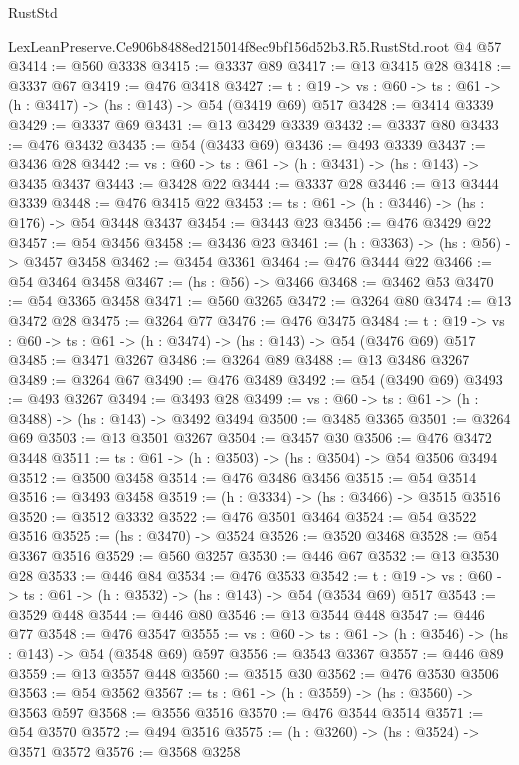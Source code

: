 \begin{lexlean}{RustStd}
\begin{coremodule}
  LexLeanPreserve.Ce906b8488ed215014f8ec9bf156d52b3.R5.RustStd.root @4 @57
@3414 := @560 @3338
@3415 := @3337 @89
@3417 := @13 @3415 @28
@3418 := @3337 @67
@3419 := @476 @3418
@3427 := {t : @19} -> {vs : @60} -> {ts : @61} -> (h : @3417) -> (hs : @143) -> @54 (@3419 @69) @517
@3428 := @3414 @3339
@3429 := @3337 @69
@3431 := @13 @3429 @3339
@3432 := @3337 @80
@3433 := @476 @3432
@3435 := @54 (@3433 @69)
@3436 := @493 @3339
@3437 := @3436 @28
@3442 := {vs : @60} -> {ts : @61} -> (h : @3431) -> (hs : @143) -> @3435 @3437
@3443 := @3428 @22
@3444 := @3337 @28
@3446 := @13 @3444 @3339
@3448 := @476 @3415 @22
@3453 := {ts : @61} -> (h : @3446) -> (hs : @176) -> @54 @3448 @3437
@3454 := @3443 @23
@3456 := @476 @3429 @22
@3457 := @54 @3456
@3458 := @3436 @23
@3461 := (h : @3363) -> (hs : @56) -> @3457 @3458
@3462 := @3454 @3361
@3464 := @476 @3444 @22
@3466 := @54 @3464 @3458
@3467 := (hs : @56) -> @3466
@3468 := @3462 @53
@3470 := @54 @3365 @3458
@3471 := @560 @3265
@3472 := @3264 @80
@3474 := @13 @3472 @28
@3475 := @3264 @77
@3476 := @476 @3475
@3484 := {t : @19} -> {vs : @60} -> {ts : @61} -> (h : @3474) -> (hs : @143) -> @54 (@3476 @69) @517
@3485 := @3471 @3267
@3486 := @3264 @89
@3488 := @13 @3486 @3267
@3489 := @3264 @67
@3490 := @476 @3489
@3492 := @54 (@3490 @69)
@3493 := @493 @3267
@3494 := @3493 @28
@3499 := {vs : @60} -> {ts : @61} -> (h : @3488) -> (hs : @143) -> @3492 @3494
@3500 := @3485 @3365
@3501 := @3264 @69
@3503 := @13 @3501 @3267
@3504 := @3457 @30
@3506 := @476 @3472 @3448
@3511 := {ts : @61} -> (h : @3503) -> (hs : @3504) -> @54 @3506 @3494
@3512 := @3500 @3458
@3514 := @476 @3486 @3456
@3515 := @54 @3514
@3516 := @3493 @3458
@3519 := (h : @3334) -> (hs : @3466) -> @3515 @3516
@3520 := @3512 @3332
@3522 := @476 @3501 @3464
@3524 := @54 @3522 @3516
@3525 := (hs : @3470) -> @3524
@3526 := @3520 @3468
@3528 := @54 @3367 @3516
@3529 := @560 @3257
@3530 := @446 @67
@3532 := @13 @3530 @28
@3533 := @446 @84
@3534 := @476 @3533
@3542 := {t : @19} -> {vs : @60} -> {ts : @61} -> (h : @3532) -> (hs : @143) -> @54 (@3534 @69) @517
@3543 := @3529 @448
@3544 := @446 @80
@3546 := @13 @3544 @448
@3547 := @446 @77
@3548 := @476 @3547
@3555 := {vs : @60} -> {ts : @61} -> (h : @3546) -> (hs : @143) -> @54 (@3548 @69) @597
@3556 := @3543 @3367
@3557 := @446 @89
@3559 := @13 @3557 @448
@3560 := @3515 @30
@3562 := @476 @3530 @3506
@3563 := @54 @3562
@3567 := {ts : @61} -> (h : @3559) -> (hs : @3560) -> @3563 @597
@3568 := @3556 @3516
@3570 := @476 @3544 @3514
@3571 := @54 @3570
@3572 := @494 @3516
@3575 := (h : @3260) -> (hs : @3524) -> @3571 @3572
@3576 := @3568 @3258

\end{coremodule}
\end{lexlean}
